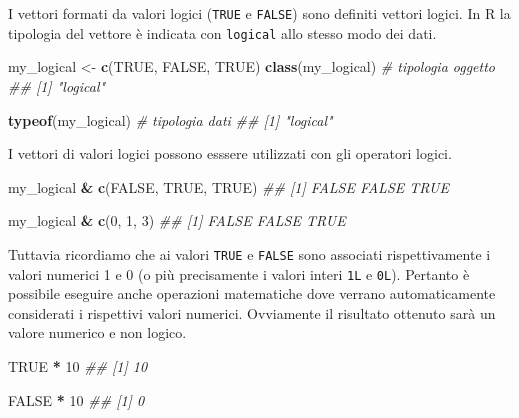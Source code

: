 \documentclass[
]{book}
\newenvironment{Shaded}{\begin{snugshade}}{\end{snugshade}}
\newcommand{\CommentTok}[1]{\textcolor[rgb]{0.56,0.35,0.01}{\textit{#1}}}
\newcommand{\DecValTok}[1]{\textcolor[rgb]{0.00,0.00,0.81}{#1}}
\newcommand{\KeywordTok}[1]{\textcolor[rgb]{0.13,0.29,0.53}{\textbf{#1}}}
\newcommand{\NormalTok}[1]{#1}
\newcommand{\OperatorTok}[1]{\textcolor[rgb]{0.81,0.36,0.00}{\textbf{#1}}}
\newcommand{\OtherTok}[1]{\textcolor[rgb]{0.56,0.35,0.01}{#1}}
\newcommand{\StringTok}[1]{\textcolor[rgb]{0.31,0.60,0.02}{#1}}
\begin{document}
I vettori formati da valori logici (\texttt{TRUE} e \texttt{FALSE}) sono definiti vettori logici. In R la tipologia del vettore è indicata con \texttt{logical} allo stesso modo dei dati.

\begin{Shaded}
\begin{Highlighting}[]
\NormalTok{my_logical <-}\StringTok{ }\KeywordTok{c}\NormalTok{(}\OtherTok{TRUE}\NormalTok{, }\OtherTok{FALSE}\NormalTok{, }\OtherTok{TRUE}\NormalTok{)}
\KeywordTok{class}\NormalTok{(my_logical)  }\CommentTok{# tipologia oggetto}
\CommentTok{## [1] "logical"}

\KeywordTok{typeof}\NormalTok{(my_logical) }\CommentTok{# tipologia dati}
\CommentTok{## [1] "logical"}
\end{Highlighting}
\end{Shaded}

I vettori di valori logici possono esssere utilizzati con gli operatori logici.

\begin{Shaded}
\begin{Highlighting}[]
\NormalTok{my_logical }\OperatorTok{&}\StringTok{ }\KeywordTok{c}\NormalTok{(}\OtherTok{FALSE}\NormalTok{, }\OtherTok{TRUE}\NormalTok{, }\OtherTok{TRUE}\NormalTok{)}
\CommentTok{## [1] FALSE FALSE  TRUE}

\NormalTok{my_logical }\OperatorTok{&}\StringTok{ }\KeywordTok{c}\NormalTok{(}\DecValTok{0}\NormalTok{, }\DecValTok{1}\NormalTok{, }\DecValTok{3}\NormalTok{)}
\CommentTok{## [1] FALSE FALSE  TRUE}
\end{Highlighting}
\end{Shaded}

Tuttavia ricordiamo che ai valori \texttt{TRUE} e \texttt{FALSE} sono associati rispettivamente i valori numerici 1 e 0 (o più precisamente i valori interi \texttt{1L} e \texttt{0L}). Pertanto è possibile eseguire anche operazioni matematiche dove verrano automaticamente considerati i rispettivi valori numerici. Ovviamente il risultato ottenuto sarà un valore numerico e non logico.

\begin{Shaded}
\begin{Highlighting}[]
\OtherTok{TRUE} \OperatorTok{*}\StringTok{ }\DecValTok{10}
\CommentTok{## [1] 10}

\OtherTok{FALSE} \OperatorTok{*}\StringTok{ }\DecValTok{10}
\CommentTok{## [1] 0}
\end{Highlighting}
\end{Shaded}
\end{document}
